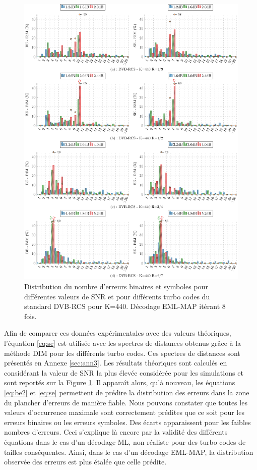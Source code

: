 \begin{figure}[!h] 
	\centering
	\hspace*{-1cm}
	\includegraphics[width=1.04\textwidth]{main/ch3_fig/be/dvb/tikz/be_440.pdf}
	\caption{Distribution du nombre d'erreurs binaires et symboles pour différentes valeurs de SNR et pour différents turbo codes du 
	standard DVB-RCS pour K=440.	Décodage EML-MAP itérant 8 fois. \label{fig:be_dvb440}}
\end{figure}

Afin de comparer ces données expérimentales avec des valeurs théoriques, l'équation \ref{eq:se} est utilisée avec les 
spectres de distances obtenus grâce à la méthode DIM pour les différents turbo codes. Ces spectres de distances sont 
présentés en Annexe \ref{sec:ann3}. Les résultats théoriques sont calculés en considérant la valeur de SNR la plus élevée 
considérée pour les simulations et sont reportés sur la Figure \ref{fig:be_dvb440}. Il apparaît alors, qu'à nouveau, les équations
\ref{eq:be2} et \ref{eq:se} permettent de prédire la distribution des erreurs dans la zone du plancher d'erreurs de manière fiable. 
Nous pouvons constater que toutes les valeurs d’occurrence maximale sont correctement prédites que ce soit pour les erreurs binaires ou les 
erreurs symboles. Des écarts apparaissent pour les faibles nombres d'erreurs. Ceci s'explique là encore par la validité des
différents équations dans le cas d'un décodage ML, non réaliste pour des turbo codes de tailles conséquentes.
Ainsi, dans le cas d'un décodage EML-MAP, la distribution observée des erreurs est plus étalée que celle prédite.

